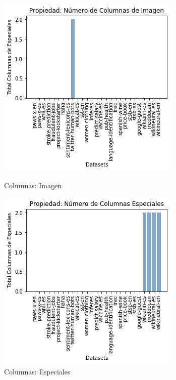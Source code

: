 \begin{figure}
  \centering
    \begin{minipage}[b]{0.31\textwidth}
        \centering
        \includegraphics[width=\textwidth]{Graphics/results/columns_i.png}
          \caption{Columnas: Imagen}
          \label{fig:columns-i}
    \end{minipage}      
\hspace{0.03cm}
    \begin{minipage}[b]{0.31\textwidth}
        \centering
        \includegraphics[width=\textwidth]{Graphics/results/columns_e.png}
          \caption{Columnas: Especiales}
          \label{fig:columns-e}
        \end{minipage} 
\end{figure}

